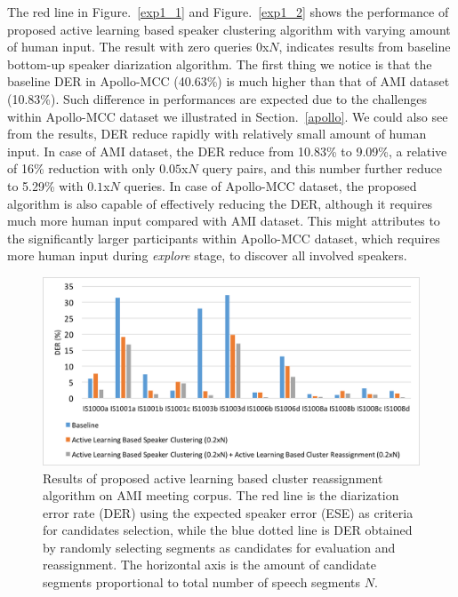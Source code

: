 \documentclass[journal]{IEEEtran}
\begin{document}
The red line in Figure.~\ref{exp1_1} and Figure.~\ref{exp1_2} shows the performance of proposed active learning based speaker clustering algorithm with varying amount of human input. The result with zero queries $0$x$N$, indicates results from baseline bottom-up speaker diarization algorithm. The first thing we notice is that the baseline DER in Apollo-MCC (40.63\%) is much higher than that of AMI dataset (10.83\%). Such difference in performances are expected due to the challenges within Apollo-MCC dataset we illustrated in Section.~\ref{apollo}. We could also see from the results, DER reduce rapidly with relatively small amount of human input. In case of AMI dataset, the DER reduce from 10.83\% to 9.09\%, a relative of 16\% reduction with only $0.05$x$N$ query pairs, and this number further reduce to 5.29\% with $0.1$x$N$ queries. In case of Apollo-MCC dataset, the proposed algorithm is also capable of effectively reducing the DER, although it requires much more human input compared with AMI dataset. This might attributes to the significantly larger participants within Apollo-MCC dataset, which requires more human input during \textit{explore} stage, to discover all involved speakers. 

\begin{figure}[t]
	\centering
	\includegraphics[width=0.75\linewidth]{figs/exp3_1}
	\caption{Results of proposed active learning based cluster reassignment algorithm on AMI meeting corpus. The red line is the diarization error rate (DER) using the expected speaker error (ESE) as criteria for candidates selection, while the blue dotted line is DER obtained by randomly selecting segments as candidates for evaluation and reassignment. The horizontal axis is the amount of candidate segments proportional to total number of speech segments $N$.}
	\label{exp2_1}
\end{figure}
\end{document}
